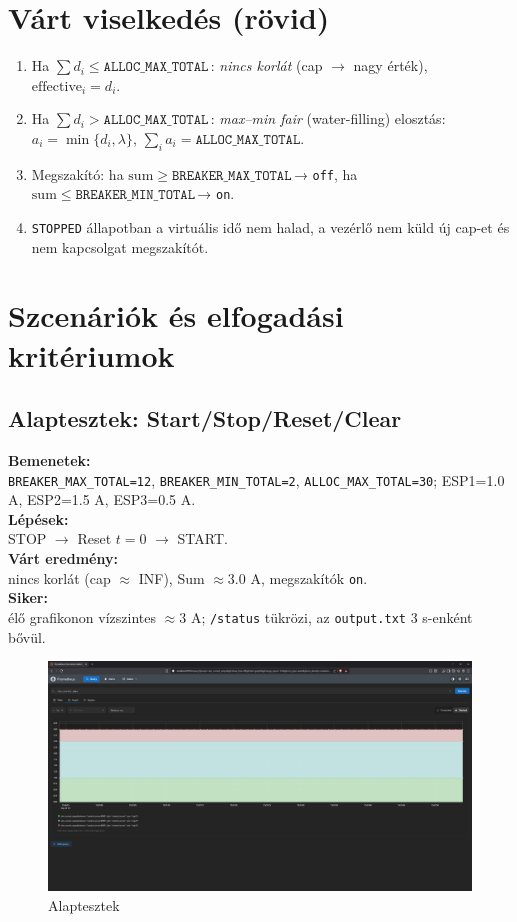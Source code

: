 \section{Várt viselkedés (rövid)}
\begin{enumerate}
  \item Ha \(\sum d_i \le \texttt{ALLOC\_MAX\_TOTAL}\)\,: \emph{nincs korlát} 
  (cap \(\to\) nagy érték), \(\mathrm{effective}_i=d_i\).
  \item Ha \(\sum d_i > \texttt{ALLOC\_MAX\_TOTAL}\)\,: \emph{max--min fair} 
  (water-filling) elosztás: \(a_i=\min\{d_i,\lambda\}\), \(\sum_i a_i = \texttt{ALLOC\_MAX\_TOTAL}\).
  \item Megszakító: ha \(\mathrm{sum} \ge \texttt{BREAKER\_MAX\_TOTAL}\)\,→ \texttt{off}, 
  ha \(\mathrm{sum} \le \texttt{BREAKER\_MIN\_TOTAL}\)\,→ \texttt{on}.
  \item \texttt{STOPPED} állapotban a  virtuális idő nem halad, 
  a vezérlő nem küld új cap-et és nem kapcsolgat megszakítót.
\end{enumerate}

\section{Szcenáriók és elfogadási kritériumok}

\subsection{Alaptesztek: Start/Stop/Reset/Clear}
\textbf{Bemenetek:}\\ \texttt{BREAKER\_MAX\_TOTAL=12}, \texttt{BREAKER\_MIN\_TOTAL=2}, 
\texttt{ALLOC\_MAX\_TOTAL=30}; ESP1=1.0 A, ESP2=1.5 A, ESP3=0.5 A.\\
\textbf{Lépések:}\\ STOP \(\to\) Reset \(t{=}0\) \(\to\) START.\\
\textbf{Várt eredmény:}\\ nincs korlát (cap \(\approx\) INF), Sum \(\approx 3.0\) A, 
megszakítók \texttt{on}.\\
\textbf{Siker:}\\ élő grafikonon vízszintes \(\approx 3\) A; \texttt{/status} tükrözi, 
az \texttt{output.txt} 3 s-enként bővül.

\begin{figure}[H]
    \centering
    \includegraphics[width=1\textwidth]{figures/alaptesztek_1.png}
    \caption{Alaptesztek}
    \label{fig:alaptesztek}
\end{figure}

